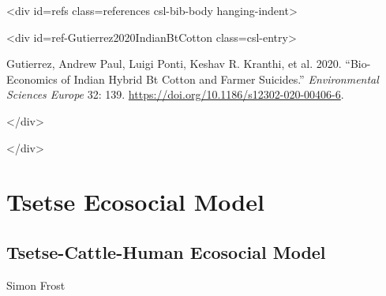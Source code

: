<div id={\textquotedbl}refs{\textquotedbl} class={\textquotedbl}references csl-bib-body hanging-indent{\textquotedbl}>



<div id={\textquotedbl}ref-Gutierrez2020IndianBtCotton{\textquotedbl} class={\textquotedbl}csl-entry{\textquotedbl}>



Gutierrez, Andrew Paul, Luigi Ponti, Keshav R. Kranthi, et al. 2020. “Bio-Economics of Indian Hybrid Bt Cotton and Farmer Suicides.” \emph{Environmental Sciences Europe} 32: 139. \href{https://doi.org/10.1186/s12302-020-00406-6}{https://doi.org/10.1186/s12302-020-00406-6}.



</div>



</div>



\chapter{Tsetse Ecosocial Model}


\section{Tsetse-Cattle-Human Ecosocial Model}



\label{14017526308633996073}{}


Simon Frost



